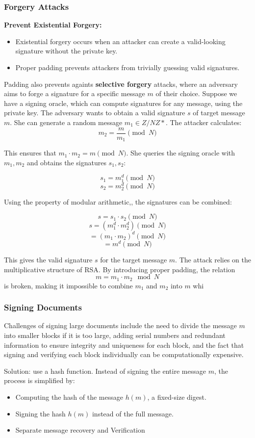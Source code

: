 \subsubsection{Forgery Attacks}
\textbf{Prevent Existential Forgery:}
    \begin{itemize}
        \item Existential forgery occurs when an attacker can create a valid-looking signature without the private key.
        \item Proper padding prevents attackers from trivially guessing valid signatures.
    \end{itemize}

Padding also prevents againts \textbf{selective forgery} attacks, where an adversary aims to forge a signature for a specific message $m$ of their choice. 
Suppose we have a signing oracle, which can compute signatures for any message, using the private key.
The adversary wants to obtain a valid signature $s$ of target message $m$. 
She can generate a random message $m_1 \in Z/NZ*$. 
The attacker calculates:
\[ m_2 = \frac{m}{m_1} \pmod{N} \]

This ensures that $m_1 \cdot m_2 = m \pmod{N}$. She queries the signing oracle with $m_1, m_2$ and obtains the signatures $s_1, s_2$:

\[ s_1 = m_1^d \pmod{N} \]
\[ s_2 = m_2^d \pmod{N} \]

Using the property of modular arithmetic,, the signatures can be combined:

\[ s = s_1 \cdot s_2 \pmod{N} \]
\[ s = (m_1^d \cdot m_2^d) \pmod{N} \]
\[ = (m_1 \cdot m_2)^d \pmod{N} \]
\[ = m^d \pmod{N} \]

This gives the valid signature $s$ for the target message $m$.
The attack relies on the multiplicative structure of RSA. By introducing proper padding, the relation 
\[
m = m_1 \cdot m_2 \mod N
\]
is broken, making it impossible to combine \( m_1 \) and \( m_2 \) into \( m \) whi

\subsubsection{Signing Documents}
Challenges of signing large documents include the need to divide the message $m$ 
into smaller blocks if it is too large, adding serial numbers and redundant information to ensure integrity and uniqueness for each block, and the fact that signing and verifying each block individually can be computationally expensive.

Solution: use a hash function. Instead of signing the entire message \(m\), the process is simplified by:
    \begin{itemize}
        \item Computing the hash of the message \(h(m)\), a fixed-size digest.
        \item Signing the hash \(h(m)\) instead of the full message.
        \item Separate message recovery and Verification
    \end{itemize}

